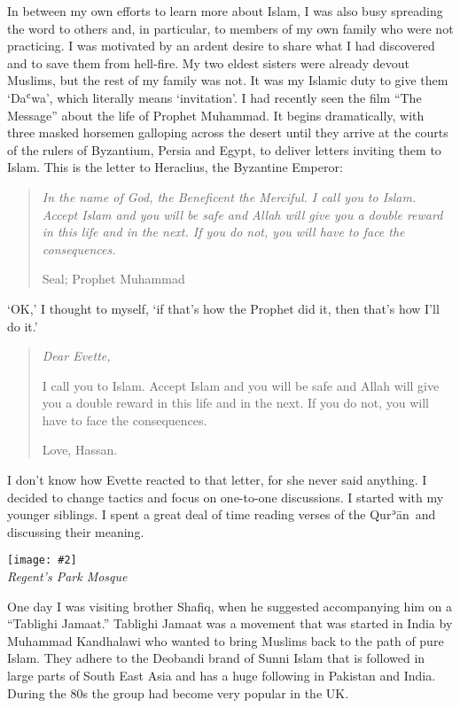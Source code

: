 \documentclass[12pt]{memoir}
\def\´{ʾ} %
\def\`{ʿ} %
\newcommand{\cor}[2]{#2} %
\def \Quran{Qur\-\´ān} %
\newcommand{\img}[3]{\begin{center}%
\texttt{[image: \#2]}\\{\small\em#3}%
\end{center}}
\begin{document}
In between my own efforts to learn more about Islam,
I was also busy spreading the word to others and, in particular,
to members of my own family who were not practicing.
I was motivated by an ardent desire to share what I had discovered
and to save them from hell-fire.
My two eldest sisters were already devout Muslims,
but the rest of my family was not.
It was my Islamic duty to give them ‘Da\`wa’,
which literally means ‘invitation’.
I had recently seen the film “The Message” about the life of Prophet Muhammad.
It begins dramatically, with three masked horsemen galloping across the desert
until they arrive at the courts of the rulers of Byzantium,
Persia and Egypt, to deliver letters inviting them to Islam.
This is the letter to Heraclius, the Byzantine Emperor:

\begin{quote}
\itshape
In the name of God, the Beneficent the Merciful.
I call you to Islam.
Accept Islam and you will be safe
and Allah will give you a double reward in this life and in the next.
If you do not, you will have to face the consequences.

Seal; Prophet Muhammad
\end{quote}

‘OK,’ I thought to myself, ‘if that’s how the Prophet did it,
then that’s how I’ll do it.’

\begin{quote}
\itshape
Dear Evette,

I call you to Islam. Accept Islam and you will be safe
and Allah will give you a double reward in this life and in the next.
If you do not, you will have to face the consequences.

Love, Hassan.
\end{quote}

I don’t know how Evette reacted to that letter, for she never said anything.
I decided to change tactics and focus on one-to-one discussions.
I started with my younger siblings.
I spent a great deal of time reading verses of the \Quran\
and discussing their meaning.

\img{scale=0.4}{Hassan_in_Regents_Park_Mosque.jpg}
{\cor{Regents}{Regent’s} Park Mosque}

One day I was visiting brother Shafiq,
when he suggested accompanying him on a “Tablighi Jamaat.”
Tablighi Jamaat was a movement that \cor{started}{was started}
in India by Muhammad Kandhalawi who wanted to bring Muslims
back to the path of pure Islam.
They adhere to the Deobandi brand of Sunni Islam that is followed
in large parts of South East Asia
and has a huge following in Pakistan and India.
During the 80s the group had become very popular in the UK.
\end{document}
